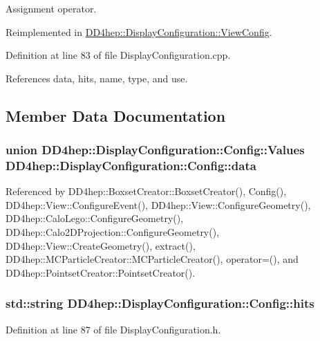 Assignment operator. 

Reimplemented in \hyperlink{class_d_d4hep_1_1_display_configuration_1_1_view_config_ad1dfdd8cd31d55cb2d6aac98d9ec0268}{DD4hep::DisplayConfiguration::ViewConfig}.

Definition at line 83 of file DisplayConfiguration.cpp.

References data, hits, name, type, and use.

\subsection{Member Data Documentation}
\hypertarget{class_d_d4hep_1_1_display_configuration_1_1_config_aae403badb7228f69c1f7fecb726e6a99}{
\subsubsection[{data}]{\setlength{\rightskip}{0pt plus 5cm}union {\bf DD4hep::DisplayConfiguration::Config::Values}  {\bf DD4hep::DisplayConfiguration::Config::data}}}
\label{class_d_d4hep_1_1_display_configuration_1_1_config_aae403badb7228f69c1f7fecb726e6a99}


Referenced by DD4hep::BoxsetCreator::BoxsetCreator(), Config(), DD4hep::View::ConfigureEvent(), DD4hep::View::ConfigureGeometry(), DD4hep::CaloLego::ConfigureGeometry(), DD4hep::Calo2DProjection::ConfigureGeometry(), DD4hep::View::CreateGeometry(), extract(), DD4hep::MCParticleCreator::MCParticleCreator(), operator=(), and DD4hep::PointsetCreator::PointsetCreator().\hypertarget{class_d_d4hep_1_1_display_configuration_1_1_config_af16ac4baf6e5e53a8ee3c971f74a5686}{
\subsubsection[{hits}]{\setlength{\rightskip}{0pt plus 5cm}std::string {\bf DD4hep::DisplayConfiguration::Config::hits}}}
\label{class_d_d4hep_1_1_display_configuration_1_1_config_af16ac4baf6e5e53a8ee3c971f74a5686}


Definition at line 87 of file DisplayConfiguration.h.

